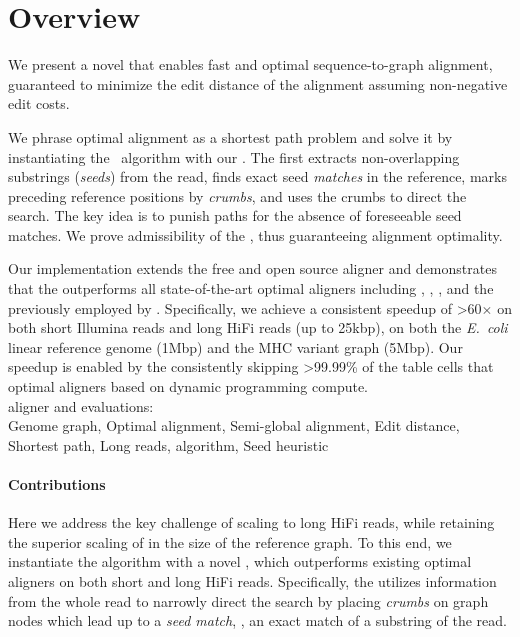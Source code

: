 \section{Overview}

We present a novel \A \emph{\seedh} that enables fast and optimal
sequence-to-graph alignment, guaranteed to minimize the edit distance of the
alignment assuming non-negative edit costs.

We phrase optimal alignment as a shortest path problem and solve it by
instantiating the \A~algorithm with our \seedh. The \seedh first extracts
non-overlapping substrings (\emph{seeds}) from the read, finds exact seed
\emph{matches} in the reference, marks preceding reference positions by
\emph{crumbs}, and uses the crumbs to direct the \A search. The key idea is to
punish paths for the absence of foreseeable seed matches. We prove admissibility
of the \seedh, thus guaranteeing alignment optimality.

\qquad Our implementation extends the free and open source aligner and
demonstrates that the \seedh outperforms all state-of-the-art optimal aligners
including \graphaligner, \vargas, \pasgal, and the \prefixh previously employed
by \astarix. Specifically, we achieve a consistent speedup of >60$\times$ on
both short Illumina reads and long HiFi reads (up to 25kbp), on both the
\textit{E.~coli} linear reference genome (1Mbp) and the MHC variant graph
(5Mbp). Our speedup is enabled by the \seedh consistently skipping >99.99\% of
the table cells that optimal aligners based on dynamic programming
compute.\\

\astarix aligner and evaluations: \astarixurl\\

Genome graph, Optimal alignment, Semi-global alignment, Edit distance, Shortest
path, Long reads, \A algorithm, Seed heuristic

\paragraph{Contributions}
%
Here we address the key challenge of scaling to long HiFi reads, while
retaining the superior scaling of \astarix in the size of the reference graph.
%
To this end, we instantiate the \A algorithm with a novel \seedh, which
outperforms existing optimal aligners on both short and long HiFi reads.
%
Specifically, the \seedh utilizes information from the whole read to narrowly
direct the \A search by placing \emph{crumbs} on graph nodes which lead up to a
\emph{seed match}, \ie, an exact match of a substring of the read.

